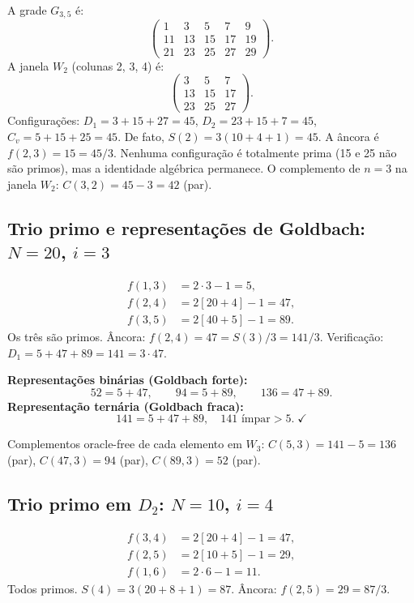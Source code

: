 \documentclass[12pt, a4paper]{article}
\begin{document}
	A grade $G_{3,5}$ é:
	\[
	\begin{pmatrix}
		1  &  3 &  5 &  7 &  9\\
		11 & 13 & 15 & 17 & 19\\
		21 & 23 & 25 & 27 & 29
	\end{pmatrix}.
	\]
	A janela $W_2$ (colunas 2, 3, 4) é:
	\[
	\begin{pmatrix}
		3  &  5 &  7\\
		13 & 15 & 17\\
		23 & 25 & 27
	\end{pmatrix}.
	\]
	Configurações: $D_1=3+15+27=45$, $D_2=23+15+7=45$, $C_v=5+15+25=45$.
	De fato, $S(2)=3(10+4+1)=45$. A âncora é $f(2,3)=15=45/3$. Nenhuma
	configuração é totalmente prima (15 e 25 não são primos), mas a identidade algébrica
	permanece. O complemento de $n=3$ na janela $W_2$: $C(3,2)=45-3=42$ (par).
	
	\subsection{Trio primo e representações de Goldbach: $N=20$, $i=3$}
	
	\begin{align*}
		f(1,3)   &= 2\cdot 3 - 1 = 5,\\
		f(2,4)   &= 2[20+4]-1 = 47,\\
		f(3,5)   &= 2[40+5]-1 = 89.
	\end{align*}
	Os três são primos. Âncora: $f(2,4)=47=S(3)/3=141/3$. Verificação:
	$D_1=5+47+89=141=3\cdot 47$.\checkmark
	
	\medskip\noindent\textbf{Representações binárias (Goldbach forte):}
	\[
	52 = 5+47,\qquad 94 = 5+89,\qquad 136 = 47+89.
	\]
	\textbf{Representação ternária (Goldbach fraca):}
	\[
	141 = 5+47+89,\quad 141\text{ ímpar}>5.\;\checkmark
	\]
	
	Complementos oracle-free de cada elemento em $W_3$:
	$C(5,3)=141-5=136$ (par), $C(47,3)=94$ (par), $C(89,3)=52$ (par).
	
	\subsection{Trio primo em $D_2$: $N=10$, $i=4$}
	
	\begin{align*}
		f(3,4)   &= 2[20+4]-1 = 47,\\
		f(2,5)   &= 2[10+5]-1 = 29,\\
		f(1,6)   &= 2\cdot 6 - 1 = 11.
	\end{align*}
	Todos primos. $S(4)=3(20+8+1)=87$. Âncora: $f(2,5)=29=87/3$.\checkmark
	
\end{document}
